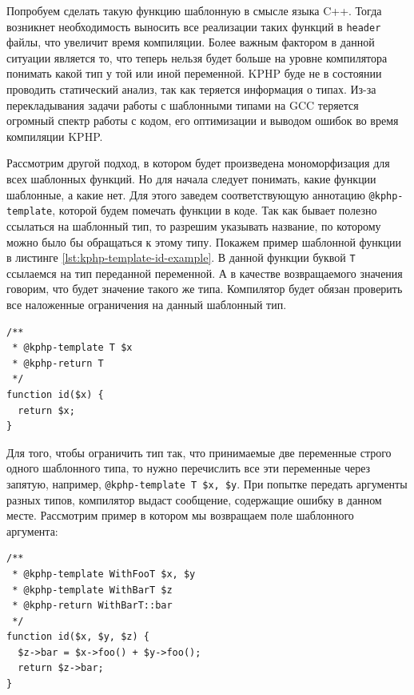 Попробуем сделать такую функцию шаблонную в смысле языка C++.
Тогда возникнет необходимость выносить все реализации таких функций в \verb|header| файлы, что увеличит время компиляции.
Более важным фактором в данной ситуации является то, что теперь нельзя будет больше на уровне компилятора понимать какой тип у той или иной переменной.
KPHP буде не в состоянии проводить статический анализ, так как теряется информация о типах.
Из-за перекладывания задачи работы с шаблонными типами на GCC \cite{gcc} теряется огромный спектр работы с кодом, его оптимизации и выводом ошибок во время компиляции KPHP.

Рассмотрим другой подход, в котором будет произведена мономорфизация для всех шаблонных функций.
Но для начала следует понимать, какие функции шаблонные, а какие нет.
Для этого заведем соответствующую аннотацию \verb|@kphp-template|, которой будем помечать функции в коде.
Так как бывает полезно ссылаться на шаблонный тип, то разрешим указывать название, по которому можно было бы обращаться к этому типу.
Покажем пример шаблонной функции в листинге \ref{lst:kphp-template-id-example}.
В данной функции буквой \verb|T| ссылаемся на тип переданной переменной.
А в качестве возвращаемого значения говорим, что будет значение такого же типа.
Компилятор будет обязан проверить все наложенные ограничения на данный шаблонный тип.
\begin{lstlisting}[caption={Пример функции id, с применением шаблонов},label={lst:kphp-template-id-example}]
/**
 * @kphp-template T $x
 * @kphp-return T
 */
function id($x) {
  return $x;
}
\end{lstlisting}

Для того, чтобы ограничить тип так, что принимаемые две переменные строго одного шаблонного типа, то нужно перечислить все эти переменные через запятую, например, \verb|@kphp-template T $x, $y|.
При попытке передать аргументы разных типов, компилятор выдаст сообщение, содержащие ошибку в данном месте.
Рассмотрим пример в котором мы возвращаем поле шаблонного аргумента:
\begin{lstlisting}[caption={Пример функции id, с применением шаблонов},label={lst:kphp-template-id-example}]
/**
 * @kphp-template WithFooT $x, $y
 * @kphp-template WithBarT $z
 * @kphp-return WithBarT::bar
 */
function id($x, $y, $z) {
  $z->bar = $x->foo() + $y->foo();
  return $z->bar;
}
\end{lstlisting}

